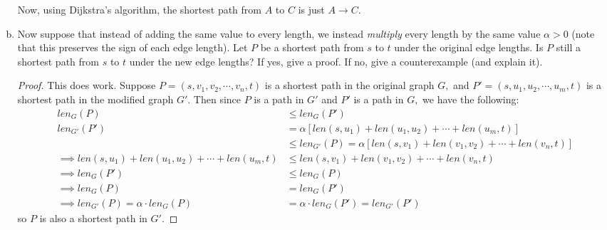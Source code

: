 \documentclass{article}
\begin{document}
\begin{enumerate}[(a)]
\begin{soln}
\begin{center}
			\end{center}
			Now, using Dijkstra's algorithm, the shortest path from $A$ to $C$ is just $A\to C.$
		\end{soln}

	\item Now suppose that instead of adding the same value to every length, we instead \emph{multiply} every length by the same value $\alpha > 0$ (note that this preserves the sign of each edge length).  Let $P$ be a shortest path from $s$ to $t$ under the original edge lengths.  Is $P$ still a shortest path from $s$ to $t$ under the new edge lengths?  If yes, give a proof.  If no, give a counterexample (and explain it).  
		\begin{proof}
			This does work. Suppose $P=(s, v_1, v_2, \cdots, v_n, t)$ is a shortest path in the original graph $G,$ and $P'=(s, u_1, u_2, \cdots, u_m, t)$ is a shortest path in the modified graph $G'.$ Then since $P$ is a path in $G'$ and $P'$ is a path in $G,$ we have the following:
			\begin{align*}
				len_G(P) &\le len_G(P') \\
				len_{G'} (P') &= \alpha\left[ len(s, u_1) + len(u_1, u_2) + \cdots + len(u_m, t) \right] \\
				&\le len_{G'}(P) = \alpha\left[ len(s, v_1) + len(v_1, v_2) + \cdots + len(v_n, t) \right] \\
				\implies len(s, u_1)+len(u_1, u_2) + \cdots + len(u_m, t) &\le len(s, v_1) + len(v_1, v_2) + \cdots + len(v_n, t) \\
				\implies len_G(P') &\le len_G(P) \\
				\implies len_G(P) &= len_G(P') \\
				\implies len_{G'}(P) = \alpha \cdot len_G(P) &= \alpha\cdot len_G(P') = len_{G'} (P')
			\end{align*}
			so $P$ is also a shortest path in $G'.$
		\end{proof}

\end{enumerate}
\end{document}
